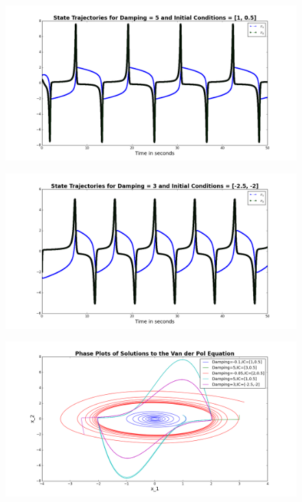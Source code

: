 \documentclass[11pt]{article}
\begin{document}
\begin{figure}[H]
\centering
\includegraphics[scale=0.35]{../output/vanderpol_trajectories3}
\end{figure}
\begin{figure}[H]
\centering
\includegraphics[scale=0.35]{../output/vanderpol_trajectories4}
\end{figure}
\begin{figure}[H]
\centering
\includegraphics[scale=0.35]{../output/vanderpol_equation}
\end{figure}
 
 
\end{document}
